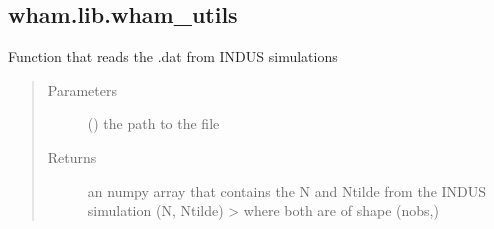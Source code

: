\documentclass[letterpaper,10pt,english]{sphinxmanual}
\begin{document}
\subsection{wham.lib.wham\_utils}
\label{\detokenize{wham.lib:module-wham.lib.wham_utils}}\label{\detokenize{wham.lib:wham-lib-wham-utils}}

\begin{fulllineitems}
\label{\detokenize{wham.lib:wham.lib.wham_utils.read_dat}}
Function that reads the .dat from INDUS simulations
\begin{quote}\begin{description}
\item[{Parameters}] \leavevmode
{} () \textendash{} the path to the file

\item[{Returns}] \leavevmode
an numpy array that contains the N and Ntilde from the INDUS simulation (N, Ntilde) \sphinxhyphen{}\textgreater{} where both are of shape (nobs,)

\end{description}\end{quote}

\end{fulllineitems}

\end{document}
